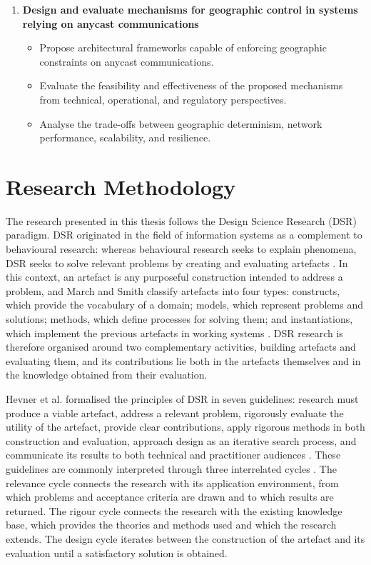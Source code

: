 \documentclass[
A4paper,                %
twoside,                %
openright,              %
chapterprefix=true,     %
12pt,                   %
headings=normal,        %
titlepage=on            %
]{book}
\begin{document}
\begin{enumerate}
    \item \textbf{Design and evaluate mechanisms for geographic control in systems relying on anycast communications}
    \begin{itemize}
        \item Propose architectural frameworks capable of enforcing geographic constraints on anycast communications.
        \item Evaluate the feasibility and effectiveness of the proposed mechanisms from technical, operational, and regulatory perspectives.
        \item Analyse the trade-offs between geographic determinism, network performance, scalability, and resilience.
    \end{itemize}
\end{enumerate}

\section{Research Methodology}
\label{sc:introduction_methodology}

The research presented in this thesis follows the Design Science Research (DSR) paradigm. DSR originated in the field of information systems as a complement to behavioural research: whereas behavioural research seeks to explain phenomena, DSR seeks to solve relevant problems by creating and evaluating artefacts \cite{Hevner2004DesignResearch}. In this context, an artefact is any purposeful construction intended to address a problem, and March and Smith classify artefacts into four types: constructs, which provide the vocabulary of a domain; models, which represent problems and solutions; methods, which define processes for solving them; and instantiations, which implement the previous artefacts in working systems \cite{March1995DesignTechnology}. DSR research is therefore organised around two complementary activities, building artefacts and evaluating them, and its contributions lie both in the artefacts themselves and in the knowledge obtained from their evaluation.

Hevner et al. formalised the principles of DSR in seven guidelines: research must produce a viable artefact, address a relevant problem, rigorously evaluate the utility of the artefact, provide clear contributions, apply rigorous methods in both construction and evaluation, approach design as an iterative search process, and communicate its results to both technical and practitioner audiences \cite{Hevner2004DesignResearch}. These guidelines are commonly interpreted through three interrelated cycles \cite{PDFResearch}. The relevance cycle connects the research with its application environment, from which problems and acceptance criteria are drawn and to which results are returned. The rigour cycle connects the research with the existing knowledge base, which provides the theories and methods used and which the research extends. The design cycle iterates between the construction of the artefact and its evaluation until a satisfactory solution is obtained.
\end{document}
